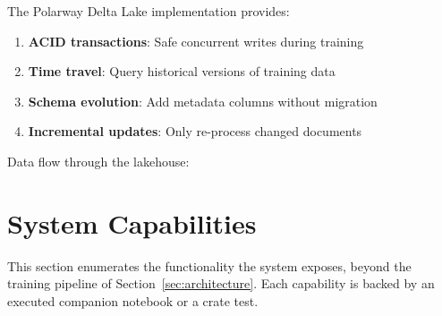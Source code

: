 \documentclass[11pt,a4paper]{article}
\theoremstyle{plain}
\theoremstyle{definition}
\begin{document}
The Polarway Delta Lake implementation \cite{alvarez2026polarway} provides:

\begin{enumerate}
    \item \textbf{ACID transactions}: Safe concurrent writes during training
    \item \textbf{Time travel}: Query historical versions of training data
    \item \textbf{Schema evolution}: Add metadata columns without migration
    \item \textbf{Incremental updates}: Only re-process changed documents
\end{enumerate}

Data flow through the lakehouse:

\begin{center}
\end{center}

\section{System Capabilities}
\label{sec:capabilities}

This section enumerates the functionality the system exposes, beyond the
training pipeline of Section~\ref{sec:architecture}. Each capability is
backed by an executed companion notebook or a crate test.
\end{document}
